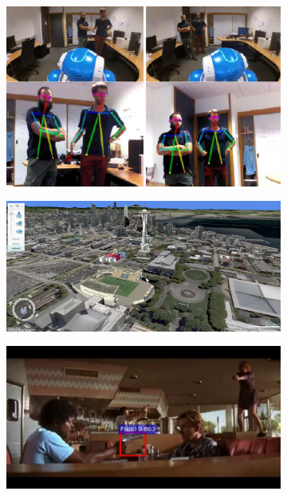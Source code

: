 \begin{figure}
\begin{subfigure}[t]{0.48\textwidth}
    \includegraphics[width=\textwidth]{img/6.png}
  \end{subfigure}
  \hfill
  \begin{subfigure}[t]{0.48\textwidth}
    \centering
    \includegraphics[width=\textwidth]{img/1.png}
  \end{subfigure}
  \hfill
  \begin{subfigure}[t]{0.48\textwidth}
    \centering
    \includegraphics[width=\textwidth]{img/8.png}
  \end{subfigure}

\end{figure}

